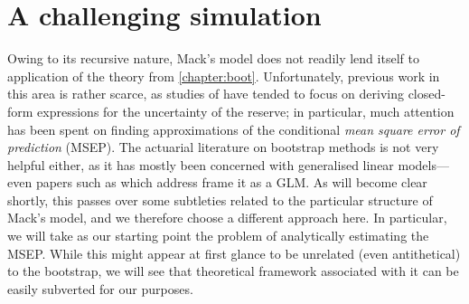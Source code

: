 \documentclass[a4paper]{book}
\begin{document}
\section{A challenging simulation} \label{sec:mack-challenge}

Owing to its recursive nature, Mack's model does not readily lend itself to application of the theory from \cref{chapter:boot}. Unfortunately, previous work in this area is rather scarce, as studies of  have tended to focus on deriving closed-form expressions for the uncertainty of the reserve; in particular, much attention has been spent on finding approximations of the conditional \emph{mean square error of prediction} (MSEP). The actuarial literature on bootstrap methods is not very helpful either, as it has mostly been concerned with generalised linear models---even papers such as \cite{england:dist} which address  frame it as a GLM. As will become clear shortly, this passes over some subtleties related to the particular structure of Mack's model, and we therefore choose a different approach here. In particular, we will take as our starting point the problem of analytically estimating the MSEP. While this might appear at first glance to be unrelated (even antithetical) to the bootstrap, we will see that theoretical framework associated with it can be easily subverted for our purposes.
\end{document}
